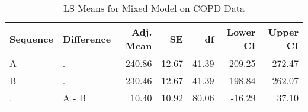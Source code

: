 \begin{table}

\caption{LS Means for Mixed Model on COPD Data}
\centering
\begin{tabular}[t]{l>{}l|rrrrr}
\toprule
Sequence & Difference & Adj. Mean & SE & df & Lower CI & Upper CI\\
\midrule
A & . & 240.86 & 12.67 & 41.39 & 209.25 & 272.47\\
B & . & 230.46 & 12.67 & 41.39 & 198.84 & 262.07\\
. & A - B & 10.40 & 10.92 & 80.06 & -16.29 & 37.10\\
\bottomrule
\end{tabular}
\end{table}

